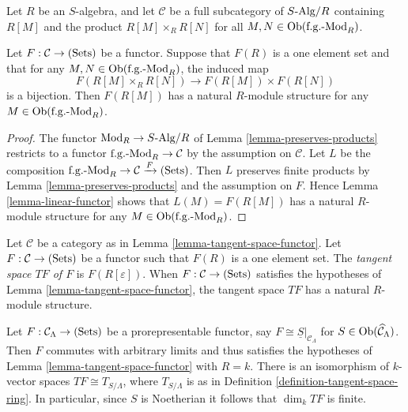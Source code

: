 \begin{lemma}
\label{lemma-tangent-space-functor}
Let $R$ be an $S$-algebra, and let $\mathcal C$ be a full subcategory of $S 
\textnormal{-Alg}/R$ containing $R[M]$ and the product $R[M] \times_{R} R[N]$ 
for all $M,N \in \textnormal{Ob}(\textnormal{f.g.-Mod}_{R})$.  

\smallskip \noindent
Let $F: \mathcal C \rightarrow \textnormal{(Sets)}$ be a functor.  Suppose that 
$F(R)$ is a one element set and that for any $M, N \in 
\textnormal{Ob}(\textnormal{f.g.-Mod}_{R})$, the induced map 
\[ F(R[M] \times_{R} R[N]) \rightarrow F(R[M]) \times F(R[N])\]
is a bijection.  Then $F(R[M])$ has a natural $R$-module structure for any $M 
\in \textnormal{Ob}(\textnormal{f.g.-Mod}_{R})$.
\end{lemma}

\begin{proof}
The functor $\textnormal{Mod}_{R} \rightarrow S \textnormal{-Alg}/R$ of Lemma 
\ref{lemma-preserves-products} restricts to a functor 
$\textnormal{f.g.-Mod}_{R} \rightarrow \mathcal C$ by the assumption on 
$\mathcal C$. Let $L$ be the composition $\textnormal{f.g.-Mod}_{R} \rightarrow 
\mathcal C \xrightarrow{F} \textnormal{(Sets)}$. Then $L$ preserves finite 
products by Lemma \ref{lemma-preserves-products} and the assumption on $F$.  
Hence Lemma \ref{lemma-linear-functor} shows that $L(M) = F(R[M])$ has a 
natural $R$-module structure for any $M \in 
\textnormal{Ob}(\textnormal{f.g.-Mod}_{R})$.
\end{proof}

\begin{definition}
\label{definition-tangent-space-over-R}
Let $\mathcal C$ be a category as in
Lemma \ref{lemma-tangent-space-functor}.  
Let $F: \mathcal C \rightarrow \textnormal{(Sets)}$ be a functor such that 
$F(R)$ is a one element set. The {\it tangent space $TF$ of $F$} is 
$F(R[\varepsilon])$.  When $F: \mathcal C \rightarrow \textnormal{(Sets)}$ 
satisfies the hypotheses of
Lemma \ref{lemma-tangent-space-functor},
the tangent space $TF$ has a natural $R$-module structure.
\end{definition}

\begin{example}
\label{example-tangent-space-prorepresentable-functor}
Let $F: \mathcal C_{\Lambda} \rightarrow \textnormal{(Sets)}$ be a 
prorepresentable functor, say $F \cong \underline{S}|_{\mathcal C_{\Lambda}}$ 
for $S \in \textnormal{Ob}(\widehat{\mathcal C}_{\Lambda})$.  Then $F$ commutes 
with arbitrary limits and thus satisfies the hypotheses of Lemma 
\ref{lemma-tangent-space-functor} with $R = k$.  There is an isomorphism of 
$k$-vector spaces $TF \cong T_{S/\Lambda}$, where $T_{S/\Lambda}$ is as in 
Definition \ref{definition-tangent-space-ring}.  In particular, since $S$ is 
Noetherian it follows that $\dim_{k} TF$ is finite.
\end{example}



